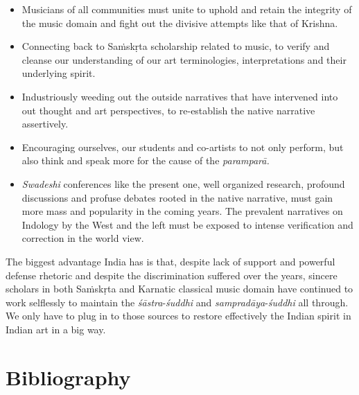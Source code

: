 \begin{itemize}
\itemsep=0pt

 \item Musicians of all communities must unite to uphold and retain the integrity of the music domain and fight out the divisive attempts like that of Krishna.

 \item Connecting back to Saṁskṛta scholarship related to music, to verify and cleanse our understanding of our art terminologies, interpretations and their underlying spirit.

 \item Industriously weeding out the outside narratives that have intervened into out thought and art perspectives, to re-establish the native narrative assertively.

 \item Encouraging ourselves, our students and co-artists to not only perform, but also think and speak more for the cause of the \textit{paramparā.}

 \item \textit{Swadeshi} conferences like the present one, well organized research, profound discussions and profuse debates rooted in the native narrative, must gain more mass and popularity in the coming years. The prevalent narratives on Indology by the West and the left must be exposed to intense verification and correction in the world view.

\end{itemize}

The biggest advantage India has is that, despite lack of support and powerful defense rhetoric and despite the discrimination suffered over the years, sincere scholars in both Saṁskṛta and Karnatic classical music domain have continued to work selflessly to maintain the \textit{śāstra}-\textit{śuddhi} and \textit{sampradāya}-\textit{śuddhi} all through. We only have to plug in to those sources to restore effectively the Indian spirit in Indian art in a big way.

\newpage

\section*{Bibliography}

